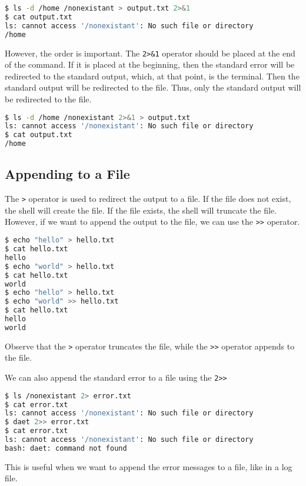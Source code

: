 \begin{lstlisting}[language=bash]
$ ls -d /home /nonexistant > output.txt 2>&1
$ cat output.txt
ls: cannot access '/nonexistant': No such file or directory
/home
\end{lstlisting}

However, the order is important. The \texttt{2>\&1} operator should
be placed at the end of the command. If it is placed at the beginning,
then the standard error will be redirected to the standard output, which,
at that point, is the terminal. Then the standard output will be redirected
to the file. Thus, only the standard output will be redirected to the file.

\begin{lstlisting}[language=bash]
$ ls -d /home /nonexistant 2>&1 > output.txt
ls: cannot access '/nonexistant': No such file or directory
$ cat output.txt
/home
\end{lstlisting}

\subsection{Appending to a File}

The \texttt{>} operator is used to redirect the output to a file. If the
file does not exist, the shell will create the file. If the file exists,
the shell will truncate the file. However, if we want to append the output
to the file, we can use the \texttt{>>} operator.

\begin{lstlisting}[language=bash]
$ echo "hello" > hello.txt
$ cat hello.txt
hello
$ echo "world" > hello.txt
$ cat hello.txt
world
$ echo "hello" > hello.txt
$ echo "world" >> hello.txt
$ cat hello.txt
hello
world
\end{lstlisting}

Observe that the \texttt{>} operator truncates the file, while the
\texttt{>>} operator appends to the file.

We can also append the standard error to a file using the \texttt{2>>}

\begin{lstlisting}[language=bash]
$ ls /nonexistant 2> error.txt
$ cat error.txt
ls: cannot access '/nonexistant': No such file or directory
$ daet 2>> error.txt
$ cat error.txt
ls: cannot access '/nonexistant': No such file or directory
bash: daet: command not found
\end{lstlisting}

This is useful when we want to append the error messages to a file,
like in a log file.

